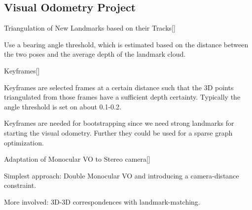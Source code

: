 \documentclass[10pt,a4paper]{scrartcl}
\begin{document}
\begin{multicols*}{2}
\subsection*{Visual Odometry Project}

\begin{QandA}{Triangulation of New Landmarks based on their Tracks}[\Application]
\item Use a bearing angle threshold, which is estimated based on the distance between the two poses and the average depth of the landmark cloud.
\end{QandA}

\begin{QandA}{Keyframes}[\Definition]
\item Keyframes are selected frames at a certain distance such that the 3D points triangulated from those frames have a sufficient depth certainty. Typically the angle threshold is set on about 0.1-0.2.
\item Keyframes are needed for bootstrapping since we need strong landmarks for starting the visual odometry. Further they could be used for a sparse graph optimization.
\end{QandA}

\begin{QandA}{Adaptation of Monocular VO to Stereo camera}[\Application]
\item Simplest approach: Double Monocular VO and introducing a camera-distance constraint.
\item More involved: 3D-3D correspondences with landmark-matching.
\end{QandA}

\end{multicols*}
\end{document}

